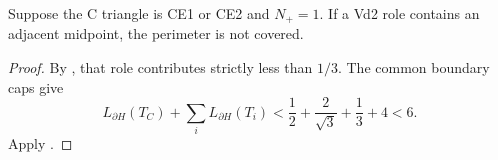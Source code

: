 \begin{proposition}
\label{prop:ce2-vd2-midpoint-length}
Suppose the C triangle is CE1 or CE2 and $N_+=1$. If a Vd2 role contains
an adjacent midpoint, the perimeter is not covered.
\end{proposition}
\begin{proof}
By , that role contributes strictly
less than $1/3$. The common boundary caps give
\[
 L_{\partial H}(T_C)+\sum_iL_{\partial H}(T_i)
 <\frac12+\frac2{\sqrt3}+\frac13+4<6.
\]
Apply .
\end{proof}
